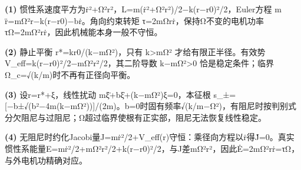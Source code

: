 \par\noindent\textbf{(1)} 惯性系速度平方为ṙ²+Ω²r²，L=m(ṙ²+Ω²r²)/2−k(r−r0)²/2，Euler方程 m r̈=mΩ²r−k(r−r0)−bṙ。角向约束转矩 τ=2mΩrṙ，保持Ω不变的电机功率 τΩ=2mΩ²rṙ，因此机械能本身一般不守恒。
\par\noindent\textbf{(2)} 静止平衡 r*=kr0/(k−mΩ²)，只有 k>mΩ² 才给有限正半径。有效势 V\_eff=k(r−r0)²/2−mΩ²r²/2，其二阶导数 k−mΩ²>0 恰是稳定条件；临界Ω\_c=√(k/m)时不再有正径向平衡。
\par\noindent\textbf{(3)} 设r=r*+ξ，线性扰动 mξ̈+bξ̇+(k−mΩ²)ξ=0，本征根 s\_±=[−b±√(b²−4m(k−mΩ²))]/(2m)。b=0时固有频率√(k/m−Ω²)，有阻尼时按判别式分欠阻尼与过阻尼；Ω超过临界使根有正实部，阻尼无法恢复线性稳定。
\par\noindent\textbf{(4)} 无阻尼时约化Jacobi量J=mṙ²/2+V\_eff(r)守恒：乘径向方程以ṙ得J̇=0。真实惯性系能量E=mṙ²/2+mΩ²r²/2+k(r−r0)²/2，与J差mΩ²r²，因此Ė=2mΩ²rṙ=τΩ，与外电机功精确对应。
